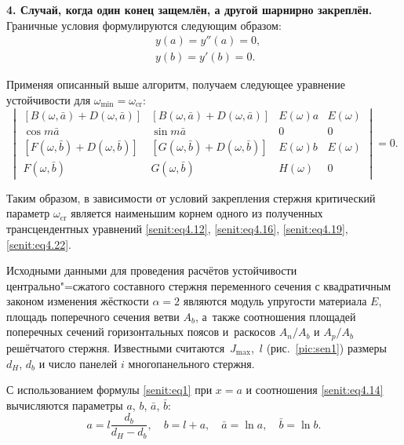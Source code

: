 \smallskip

\textbf{4. Случай, когда один конец защемлён, а другой шарнирно закреплён.} Граничные условия формулируются следующим образом:
\begin{equation}
\label{senit:eq4.21}
\begin{aligned}
& y(a)=y''(a)=0, \\
& y(b)=y'(b)=0.
\end{aligned}
\end{equation}

Применяя описанный выше алгоритм, получаем следующее уравнение устойчивости
для $\omega_{\min}=\omega_{\text{cr}}$:
\begin{equation}
\label{senit:eq4.22}
\begin{vmatrix}
\left[ B(\omega, \bar {a})+D(\omega, \bar {a}) \right] & \left[ B(\omega, \bar {a})+D(\omega, \bar {a})\right] & E(\omega)a & E (\omega) \\
\cos m {\bar {a}} & \sin m \bar {a} & 0 &  0 \\
\left[ F(\omega , \bar {b})+D(\omega, \bar {b}) \right] & \left[ G( \omega, \bar {b})+D( \omega ,\bar {b})\right] & E( \omega ) b &E (\omega) \\
F(\omega , \bar {b})& G(\omega, \bar {b})& H(\omega) & 0 
\end{vmatrix}=0.
\end{equation}

Таким образом, в зависимости от условий закрепления стержня критический
параметр $\omega _\text{cr}$ является наименьшим корнем одного из полученных
трансцендентных уравнений \eqref{senit:eq4.12}, \eqref{senit:eq4.16}, \eqref{senit:eq4.19}, \eqref{senit:eq4.22}.

\smallskip

 Исходными данными для проведения расчётов устойчивости центрально"=сжатого
составного стержня переменного сечения с квадратичным законом изменения
жёсткости
$\alpha=2$
являются модуль упругости материала $E$, площадь поперечного сечения ветви
$A_b$, а~также соотношения площадей поперечных сечений горизонтальных
поясов и~раскосов $A_n/A_b$  и $A_p/A_b$ решётчатого стержня. Известными считаются~$J_{\max}$,~$l$ (рис.~\ref{pic:sen1}) размеры
$d_H$, $d_b$ и число панелей $i$ многопанельного стержня.



С использованием формулы \eqref{senit:eq1} при $x=a$ и соотношения \eqref{senit:eq4.14} вычисляются
параметры $a$, $b$, $\bar {a}$, $\bar {b}$:
\[
a=l \frac{d_b }{d_H -d_b },\quad b=l+a,\quad \bar
{a}=\ln a,\quad \bar {b}=\ln b.
\]

